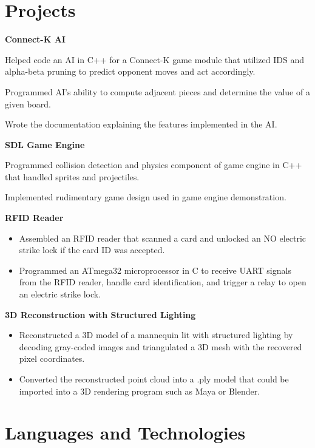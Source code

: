 \documentclass[10pt, letterpaper, sans]{moderncv} %
\begin{document}
\section{Projects}
\textbf{Connect-K AI}
\begin{itemize}
{
\item Helped code an AI in C++ for a Connect-K game module that utilized IDS and alpha-beta pruning to predict opponent moves and act accordingly.
\item Programmed AI's ability to compute adjacent pieces and determine the value of a given board.
\item Wrote the documentation explaining the features implemented in the AI.
}
\end{itemize}

\textbf{SDL Game Engine}
\begin{itemize}
{
\item Programmed collision detection and physics component of game engine in C++ that handled sprites and projectiles.
\item Implemented rudimentary game design used in game engine demonstration.
}
\end{itemize}

\textbf{RFID Reader}
\begin{itemize}
\item Assembled an RFID reader that scanned a card and unlocked an NO electric strike lock if the card ID was accepted.
\item Programmed an ATmega32 microprocessor in C to receive UART signals from the RFID reader, handle card identification, and trigger a relay to open an electric strike lock.
\end{itemize}

\textbf{3D Reconstruction with Structured Lighting}
\begin{itemize}
\item Reconstructed a 3D model of a mannequin lit with structured lighting by decoding gray-coded images and triangulated a 3D mesh with the recovered pixel coordinates.
\item Converted the reconstructed point cloud into a .ply model that could be imported into a 3D rendering program such as Maya or Blender.
\end{itemize}

\section{Languages and Technologies}
\end{document}
